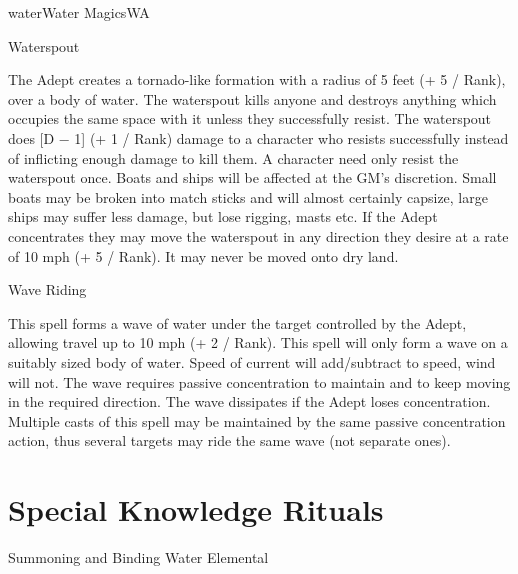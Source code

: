 \begin{College}[1.3]{water}{Water Magics}{WA}
\begin{spell}[S-14]{Waterspout}
\begin{effects}
The Adept creates a tornado-like formation with a radius of 5 feet (+
5 / Rank), over a body of water.  The waterspout kills anyone and
destroys anything which occupies the same space with it unless they
successfully resist.  The waterspout does [D − 1] (+ 1 / Rank) damage
to a character who resists successfully instead of inflicting enough
damage to kill them. A character need only resist the waterspout
once. Boats and ships will be affected at the GM’s discretion.  Small
boats may be broken into match sticks and will almost certainly
capsize, large ships may suffer less damage, but lose rigging, masts
etc.  If the Adept concentrates they may move the waterspout in any
direction they desire at a rate of 10 mph (+ 5 / Rank). It may never
be moved onto dry land.
\end{effects}
\end{spell}

\begin{spell}[S-15]{Wave Riding}

\begin{effects}
This spell forms a wave of water under the target controlled by the
Adept, allowing travel up to 10 mph (+ 2 / Rank). This spell will only
form a wave on a suitably sized body of water.  Speed of current will
add/subtract to speed, wind will not.  The wave requires passive
concentration to maintain and to keep moving in the required
direction.  The wave dissipates if the Adept loses concentration.
Multiple casts of this spell may be maintained by the same passive
concentration action, thus several targets may ride the same wave (not
separate ones).
\end{effects}
\end{spell}


\section{Special Knowledge Rituals}

\begin{ritual}[R-1]{Summoning and Binding Water Elemental}


\end{ritual}
\end{College}
